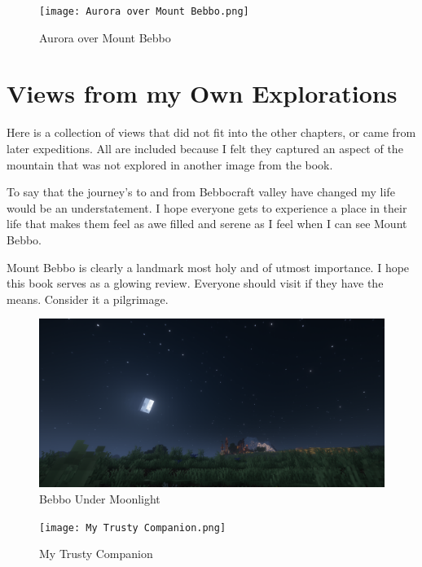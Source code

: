 \begin{figure}[H]
	\centering
	\texttt{[image: Aurora over Mount Bebbo.png]}
	\caption{Aurora over Mount Bebbo}
\end{figure}

\chapter{Views from my Own Explorations}

Here is a collection of views that did not fit into the other chapters, or came from later expeditions. All are included because I felt they captured an aspect of the mountain that was not explored in another image from the book.

To say that the journey's to and from Bebbocraft valley have changed my life would be an understatement. I hope everyone gets to experience a place in their life that makes them feel as awe filled and serene as I feel when I can see Mount Bebbo. 

Mount Bebbo is clearly a landmark most holy and of utmost importance. I hope this book serves as a glowing review. Everyone should visit if they have the means. Consider it a pilgrimage. 
\begin{figure}[H]
	\centering
	\includegraphics[width=\linewidth]{Bebbo Under Moonlight.png}
	\caption{Bebbo Under Moonlight}
\end{figure}

\begin{figure}[H]
	\centering
	\texttt{[image: My Trusty Companion.png]}
	\caption{My Trusty Companion}
\end{figure}

